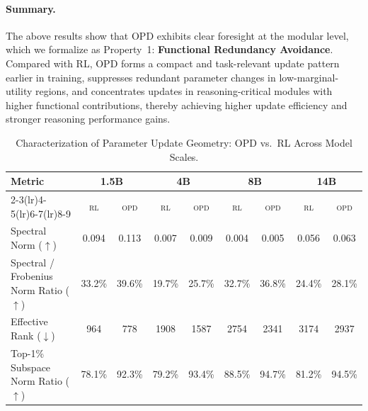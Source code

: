 \documentclass{article}
\begin{document}
\paragraph{Summary.}
The above results show that OPD exhibits clear foresight at the modular level, which we formalize as Property~1: \textbf{Functional Redundancy Avoidance}. Compared with RL, OPD forms a compact and task-relevant update pattern earlier in training, suppresses redundant parameter changes in low-marginal-utility regions, and concentrates updates in reasoning-critical modules with higher functional contributions, thereby achieving higher update efficiency and stronger reasoning performance gains.




\begin{table}[t]
\centering
\caption{Characterization of Parameter Update Geometry: OPD vs.\ RL Across Model Scales.}
\label{table1}
\setlength{\tabcolsep}{2.5pt}
\renewcommand{\arraystretch}{0.95}
\begin{tabular}{l *{4}{cc}}
\toprule
\multirow{2}{*}{Metric}
& \multicolumn{2}{c}{\textbf{1.5B}}
& \multicolumn{2}{c}{\textbf{4B}}
& \multicolumn{2}{c}{\textbf{8B}}
& \multicolumn{2}{c}{\textbf{14B}} \\
\cmidrule(lr){2-3}\cmidrule(lr){4-5}\cmidrule(lr){6-7}\cmidrule(lr){8-9}
& \textsc{rl} & \textsc{opd}
& \textsc{rl} & \textsc{opd}
& \textsc{rl} & \textsc{opd}
& \textsc{rl} & \textsc{opd} \\
\midrule
Spectral Norm ($\uparrow$)
& 0.094 & 0.113
& 0.007 & 0.009
& 0.004 & 0.005
& 0.056 & 0.063 \\
Spectral / Frobenius Norm Ratio ($\uparrow$)
& 33.2\% & 39.6\%
& 19.7\% & 25.7\%
& 32.7\% & 36.8\%
& 24.4\% & 28.1\% \\
Effective Rank ($\downarrow$)
& 964  & 778
& 1908 & 1587
& 2754 & 2341
& 3174 & 2937 \\
Top-1\% Subspace Norm Ratio ($\uparrow$)
& 78.1\% & 92.3\%
& 79.2\% & 93.4\%
& 88.5\% & 94.7\%
& 81.2\% & 94.5\% \\
\bottomrule
\end{tabular}
\end{table}
\end{document}
